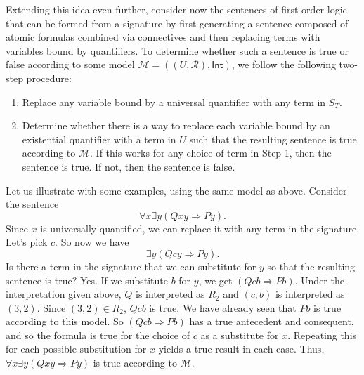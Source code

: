 \documentclass[11pt]{article}
\theoremstyle{definition}
\theoremstyle{remark}
\begin{document}
Extending this idea even further, consider now the sentences of first-order logic that can be formed from a signature by first generating a sentence composed of atomic formulas combined via connectives and then replacing terms with variables bound by quantifiers. To determine whether such a sentence is true or false according to some model $\mathcal{M}=((U,\mathcal{R}),\textsf{Int})$, we follow the following two-step procedure:
\begin{enumerate}
    \item Replace any variable bound by a universal quantifier with any term in $S_{T}$.

    \item Determine whether there is a way to replace each variable bound by an existential quantifier with a term in $U$ such that the resulting sentence is true according to $\mathcal{M}$. If this works for any choice of term in Step 1, then the sentence is true. If not, then the sentence is false.
\end{enumerate}
Let us illustrate with some examples, using the same model as above. Consider the sentence $$\forall x \exists y (Qxy\Rightarrow Py).$$ Since $x$ is universally quantified, we can replace it with any term in the signature. Let's pick $c$. So now we have $$\exists y (Qcy\Rightarrow Py).$$ Is there a term in the signature that we can substitute for $y$ so that the resulting sentence is true? Yes. If we substitute $b$ for $y$, we get $(Qcb\Rightarrow Pb)$. Under the interpretation given above, $Q$ is interpreted as $R_{2}$ and $(c,b)$ is interpreted as $(3,2)$. Since $(3,2)\in R_{2}$, $Qcb$ is true. We have already seen that $Pb$ is true according to this model. So $(Qcb\Rightarrow Pb)$ has a true antecedent and consequent, and so the formula is true for the choice of $c$ as a substitute for $x$. Repeating this for each possible substitution for $x$ yields a true result in each case. Thus, $\forall x \exists y (Qxy\Rightarrow Py)$ is true according to $\mathcal{M}$.\par 
\end{document}
